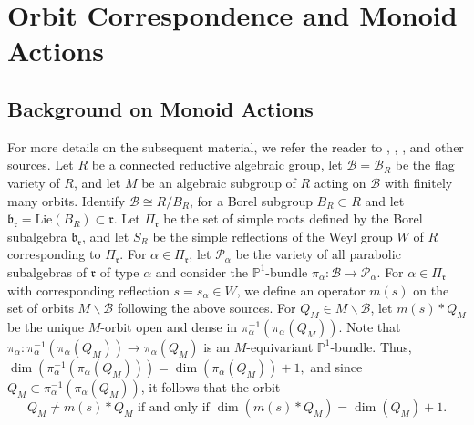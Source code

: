 \documentclass[12pt]{amsart}
\numberwithin{equation}{section}
\newcommand{\fr}{\mbox{${\mathfrak r}$}}
\newcommand{\fb}{\mbox{${\mathfrak b}$}}
\newcommand{\B}{\mathcal{B}}
\begin{document}
\section{Orbit Correspondence and Monoid Actions}\label{s:monoidactions}
\subsection{Background on Monoid Actions}\label{ss:monoidbackground}

For more details on the subsequent material, we refer the reader to \cite{RS}, \cite{Vg}, \cite{CEexp}, \cite{CE21I} and other sources.
Let $R$ be a connected reductive algebraic group, let $\B=\B_{R}$ be the flag 
variety of $R$, and let $M$ be an algebraic subgroup of $R$ acting on $\B$ with finitely many orbits.  Identify $\B \cong R/B_{R}$, for a Borel subgroup $B_{R}\subset R$ and let $\fb_{\fr}=\mbox{Lie}(B_{R})\subset\fr$.  
Let $\Pi_{\fr}$ be the set of simple roots defined by the Borel subalgebra $\fb_{\fr}$, and let $S_{R}$ be the simple reflections of the Weyl group $W$ of $R$ corresponding to $\Pi_{\fr}$.  For $\alpha\in \Pi_{\fr}$, let $\mathcal{P}_{\alpha}$ be the variety of all parabolic subalgebras of $\fr$ of type $\alpha$ and consider the $\mathbb{P}^{1}$-bundle $\pi_{\alpha}:\B \to {\mathcal{P}}_{\alpha}$.  %
For $\alpha \in \Pi_{\fr}$ with corresponding reflection $s=s_{\alpha} \in W$, we define an operator $m(s)$ on the set of orbits $M\backslash \B$ following the above sources.  For $Q_M \in M\backslash \B$, let $m(s)*Q_{M}$ be the unique $M$-orbit open and dense in $\pi_{\alpha}^{-1}(\pi_{\alpha}(Q_{M})).$  Note that $\pi_{\alpha}: \pi_{\alpha}^{-1}(\pi_{\alpha}(Q_{M}))\to \pi_{\alpha}(Q_{M})$ is an $M$-equivariant 
$\mathbb{P}^{1}$-bundle. Thus, $\dim(\pi_{\alpha}^{-1}(\pi_{\alpha}(Q_{M})))=\dim(\pi_{\alpha}(Q_{M}))+1,$ and since $Q_M \subset \pi_{\alpha}^{-1}(\pi_{\alpha}(Q_{M}))$, it follows that the orbit 
\begin{equation}\label{eq:basicmonoid} 
Q_{M} \neq m(s)*Q_{M}  \text{ if and only if } \dim(m(s)*Q_{M})=\dim(Q_{M})+1.
\end{equation}
\end{document}
